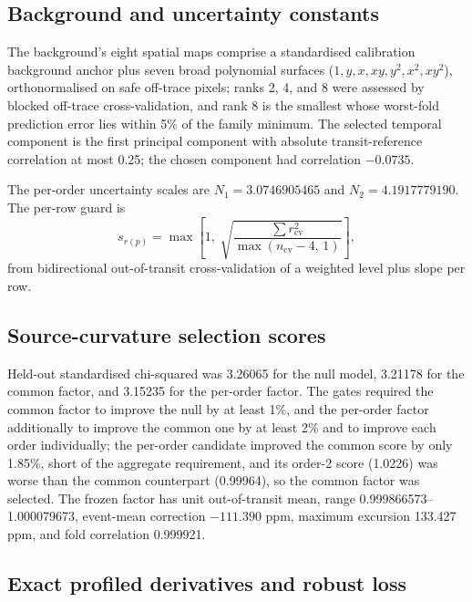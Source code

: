 \subsection{Background and uncertainty constants}

The background's eight spatial maps comprise a standardised calibration
background anchor plus seven broad polynomial surfaces
($1, y, x, xy, y^2, x^2, xy^2$), orthonormalised on safe off-trace
pixels; ranks 2, 4, and 8 were assessed by blocked off-trace
cross-validation, and rank 8 is the smallest whose worst-fold prediction
error lies within 5\% of the family minimum. The selected temporal
component is the first principal component with absolute
transit-reference correlation at most 0.25; the chosen component had
correlation $-0.0735$.

The per-order uncertainty scales are $N_1=3.0746905465$ and
$N_2=4.1917779190$. The per-row guard is
\begin{equation}
 s_{r(p)}=\max\!\left[1,\;
 \sqrt{\frac{\sum r_{\mathrm{cv}}^2}{\max(n_{\mathrm{cv}}-4,\,1)}}\right],
\end{equation}
from bidirectional out-of-transit cross-validation of a weighted level
plus slope per row.

\subsection{Source-curvature selection scores}

Held-out standardised chi-squared was 3.26065 for the null model, 3.21178
for the common factor, and 3.15235 for the per-order factor. The gates
required the common factor to improve the null by at least 1\%, and the
per-order factor additionally to improve the common one by at least 2\%
and to improve each order individually; the per-order candidate improved
the common score by only 1.85\%, short of the aggregate requirement, and
its order-2 score (1.0226) was worse than the common counterpart
(0.99964), so the common factor was selected. The frozen factor has unit
out-of-transit mean, range 0.999866573--1.000079673, event-mean
correction $-111.390$ ppm, maximum excursion 133.427 ppm, and fold
correlation 0.999921.

\subsection{Exact profiled derivatives and robust loss}


